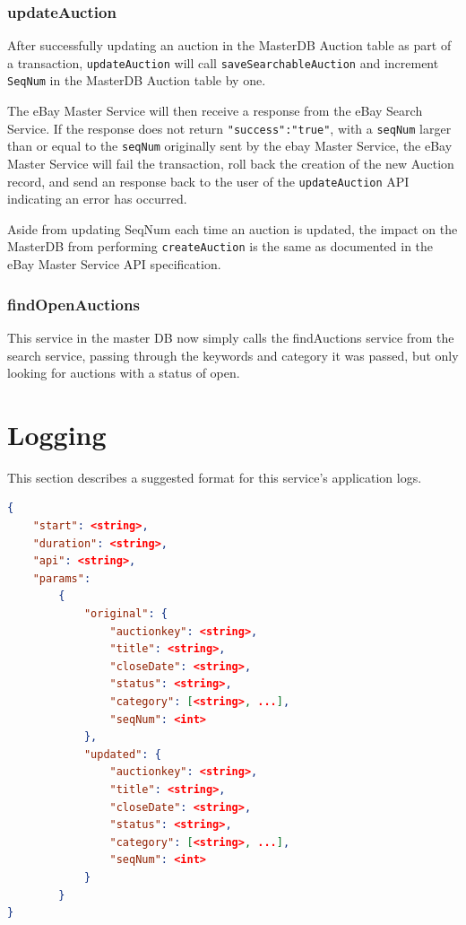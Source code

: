 \documentclass[12pt,a4paper]{article}
\begin{document}
\subsubsection{updateAuction}

After successfully updating an auction in the MasterDB Auction table as part of a transaction, 
 \texttt{updateAuction} will call \texttt{saveSearchableAuction} and increment \texttt{SeqNum} 
 in the MasterDB Auction table by one.

 \vspace{\baselineskip} 

The eBay Master Service will then receive a response from the eBay Search Service.
If the response does not return \texttt{"success":"true"}, with a \texttt{seqNum}
larger than or equal to the \texttt{seqNum} originally sent by the ebay Master Service, 
the eBay Master Service will fail the transaction, roll back the creation of the new Auction record, 
and send an response back to the user of the \texttt{updateAuction} API 
indicating an error has occurred.

\vspace{\baselineskip} 
Aside from updating SeqNum each time an auction is updated, the 
impact on the MasterDB from performing \texttt{createAuction} is the same as 
documented in the eBay Master Service API specification.

\subsubsection{findOpenAuctions}
This service in the master DB now simply calls the findAuctions service from
the search service, passing through the keywords and category it was passed,
but only looking for auctions with a status of open.

\pagebreak
\section{Logging}

This section describes a suggested format for this service's application logs.

\begin{lstlisting}[boxpos=t,language=json,firstnumber=1]
{
    "start": <string>,
    "duration": <string>,
    "api": <string>,
    "params":
        {
            "original": {
                "auctionkey": <string>,
                "title": <string>,
                "closeDate": <string>,
                "status": <string>, 
                "category": [<string>, ...],
                "seqNum": <int> 
            }, 
            "updated": {
                "auctionkey": <string>,
                "title": <string>,
                "closeDate": <string>,
                "status": <string>,
                "category": [<string>, ...],
                "seqNum": <int> 
            }
        }
}           
\end{lstlisting}
\end{document}
